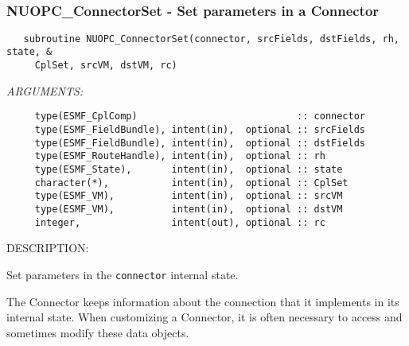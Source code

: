  
\mbox{}\hrulefill\ 
 
\subsubsection [NUOPC\_ConnectorSet] {NUOPC\_ConnectorSet - Set parameters in a Connector}


  
\begin{verbatim}   subroutine NUOPC_ConnectorSet(connector, srcFields, dstFields, rh, state, &
     CplSet, srcVM, dstVM, rc)\end{verbatim}{\em ARGUMENTS:}
\begin{verbatim}     type(ESMF_CplComp)                            :: connector
     type(ESMF_FieldBundle), intent(in),  optional :: srcFields
     type(ESMF_FieldBundle), intent(in),  optional :: dstFields
     type(ESMF_RouteHandle), intent(in),  optional :: rh
     type(ESMF_State),       intent(in),  optional :: state
     character(*),           intent(in),  optional :: CplSet
     type(ESMF_VM),          intent(in),  optional :: srcVM
     type(ESMF_VM),          intent(in),  optional :: dstVM
     integer,                intent(out), optional :: rc\end{verbatim}
{\sf DESCRIPTION:\\ }


     Set parameters in the {\tt connector} internal state.
  
     The Connector keeps information about the connection that it implements 
     in its internal state. When customizing a Connector, it is often necessary
     to access and sometimes modify these data objects.
  
